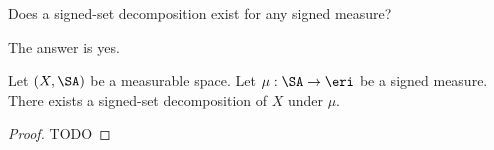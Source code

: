 \sbasic


\sstart



Does a signed-set decomposition
exist for any signed measure?


The answer is yes.

\begin{prop}
Let $(X, \SA)$ be
a measurable space.
Let $\mu: \SA \to \eri$
be a signed measure.
There exists a signed-set
decomposition of $X$ under $\mu$.
  \begin{proof}
    TODO
  \end{proof}
\end{prop}


\strats
